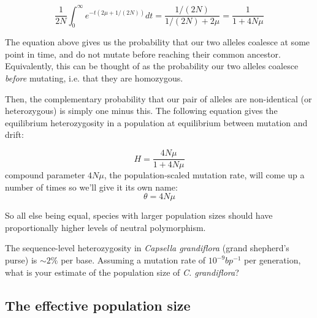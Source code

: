 \begin{equation}
\frac{1}{2N} \int_0^{\infty} e^{-t(2\mu+1/(2N))} dt =
\frac{1/(2N)}{1/(2N)+2\mu} = \frac{1}{1+4N\mu}
\end{equation}

The equation above gives us the probability that our two alleles coalesce at some point
in time, and do not mutate before reaching their common
ancestor. Equivalently, this can be thought of as the probability our two
alleles coalesce \emph{before} mutating, i.e. that they are homozygous. 

Then, the complementary probability that our pair of alleles are non-identical
(or heterozygous) is simply one minus this. The following equation gives the equilibrium
heterozygosity in a population at equilibrium between mutation and drift:


\begin{equation}
  H = \frac{4N\mu}{1+4N\mu} \label{eqn:hetero}
\end{equation}
 compound parameter $4N\mu$, the population-scaled mutation rate,
will come up a number of times so we'll give it its own name:
\begin{equation}
\theta = 4N\mu
\end{equation}

So all else being equal, species with larger population sizes should
have proportionally higher levels of neutral polymorphism.  

\begin{question}
The sequence-level heterozygosity in {\it Capsella grandiflora} (grand shepherd's purse) is $\sim 2\%$ per base. Assuming a mutation rate of $10^{-9} bp^{-1}$ per generation, what is your estimate of the population size of {\it C. grandiflora}?  
\end{question}

\subsection{The effective population size}

